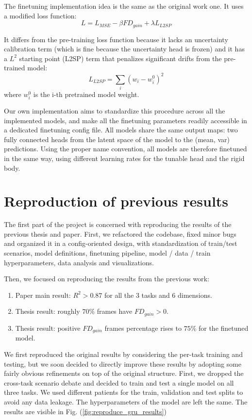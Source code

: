 \documentclass[
reprint,
aps,
prd,
superscriptaddress,
nofootinbib
]{revtex4-2}
\begin{document}
The finetuning implementation idea is the same as the original work one. It uses a modified loss function:
\begin{equation}
    L = L_{MSE} - \beta FD_{gain} + \lambda L_{L2SP}
\end{equation}

It differs from the pre-training loss function because it lacks an uncertainty calibration term (which is fine because the uncertainty head is frozen) and it has a $L^2$ starting point (L2SP) term that penalizes significant drifts from the pre-trained model:
\begin{equation}
    L_{L2SP} = \sum_i (w_i - w^0_i)^2
\end{equation}
where $w^0_i$ is the i-th pretrained model weight.

Our own implementation aims to standardize this procedure across all the implemented models, and make all the finetuning parameters readily accessible in a dedicated finetuning config file. All models share the same output maps: two fully connected heads from the latent space of the model to the (mean, var) predictions. Using the proper name convention, all models are therefore finetuned in the same way, using different learning rates for the tunable head and the rigid body.


\section{Reproduction of previous results}

The first part of the project is concerned with reproducing the results of the previous thesis and paper. First, we refactored the codebase, fixed minor bugs and organized it in a config-oriented design, with standardization of train/test scenarios, model definitions, finetuning pipeline, model / data / train hyperparameters, data analysis and visualizations. 

Then, we focused on reproducing the results from the previous work:
\begin{enumerate}
    \item Paper main result: $R^2 > 0.87$ for all the 3 tasks and 6 dimensions.
    \item Thesis result: roughly $70\%$ frames have $FD_{gain} > 0$.
    \item Thesis result: positive $FD_{gain}$ frames percentage rises to $75\%$ for the finetuned model.
\end{enumerate}

We first reproduced the original results by considering the per-task training and testing, but we soon decided to directly improve these results by adopting some fairly obvious refinements on top of the original structure. First, we dropped the cross-task scenario debate and decided to train and test a single model on all three tasks. We used different patients for the train, validation and test splits to avoid any data leakage. The hyperparameters of the model are left the same. The results are visible in Fig. (\ref{fig:reproduce_gru_results})
\end{document}
